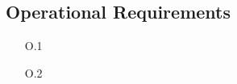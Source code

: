 \pagebreak
\subsection{Operational Requirements}

\begin{enumerate}
    \item[O.1]
    \item[O.2]
\end{enumerate}